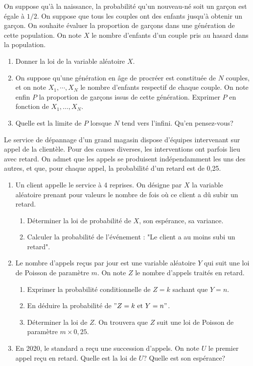 \documentclass{book}
\begin{document}
\begin{Exercice}

On suppose qu'à la naissance, la probabilité qu'un nouveau-né soit un garçon est égale à $1/2$. On suppose que
tous les couples ont des enfants jusqu'à obtenir un garçon. On souhaite évaluer la proportion de garçons dans une génération
de cette population. On note $X$ le nombre d'enfants d'un couple pris au hasard dans la population.
\begin{enumerate}
\item Donner la loi de la variable aléatoire $X$.
\item On suppose qu'une génération en âge de procréer est constituée de $N$ couples, et on note $X_1,\cdots,X_N$ le nombre d'enfants respectif de chaque couple. On note enfin $P$ la proportion de garçons issus de cette génération. 
Exprimer $P$ en fonction de $X_1,\dots,X_N$.
\item Quelle est la limite de $P$ lorsque $N$ tend vers l'infini. Qu'en pensez-vous?
\end{enumerate}
\end{Exercice}

\begin{Exercice}
Le service de dépannage d'un grand magasin dispose d'équipes intervenant sur appel de la clientèle. Pour des causes diverses, les interventions ont parfois lieu avec retard. On admet que les appels se produisent indépendamment les uns des autres, et que, pour chaque appel, la probabilité d'un retard est de 0,25.
\begin{enumerate}
\item Un client appelle le service à 4 reprises. On désigne par $X$ la variable aléatoire prenant pour valeurs le nombre de fois où ce client 
a dû subir un retard. 
\begin{enumerate}
\item Déterminer la loi de probabilité de $X$, son espérance, sa variance.
\item Calculer la probabilité de l'événement : "Le client a au moins subi un retard".
\end{enumerate}
\item Le nombre d'appels reçus par jour est une variable aléatoire $Y$ qui suit une loi de Poisson de paramètre $m$. On note $Z$ le nombre d'appels traités en retard.
\begin{enumerate}
\item Exprimer la probabilité conditionnelle de $Z=k$ sachant que $Y=n$. 
\item En déduire la probabilité de $"Z=k\textrm{ et }Y=n"$.
\item Déterminer la loi de $Z$. On trouvera que $Z$ suit une loi de Poisson de paramètre $m\times0,25$.
\end{enumerate}
\item En 2020, le standard a reçu une succession d'appels. On note $U$ le premier appel reçu en retard. Quelle est la loi de $U$? Quelle est son espérance?
\end{enumerate}
\end{Exercice}
\end{document}
